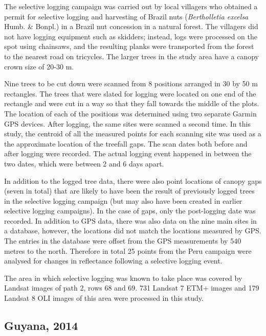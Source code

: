\documentclass[a4paper,12pt]{scrbook}
\begin{document}
The selective logging campaign was carried out by local villagers who obtained a permit for selective logging and harvesting of Brazil nuts (\textit{Bertholletia excelsa} Humb. \& Bonpl.) in a Brazil nut concession in a natural forest. The villagers did not have logging equipment such as skidders; instead, logs were processed on the spot using chainsaws, and the resulting planks were transported from the forest to the nearest road on tricycles. The larger trees in the study area have a canopy crown size of 20-30 m.

Nine trees to be cut down were scanned from 8 positions arranged in 30 by 50 m rectangles. The trees that were slated for logging were located on one end of the rectangle and were cut in a way so that they fall towards the middle of the plots. The location of each of the positions was determined using two separate Garmin \ac{GPS} devices. After logging, the same sites were scanned a second time. In this study, the centroid of all the measured points for each scanning site was used as a the approximate location of the treefall gaps. The scan dates both before and after logging were recorded. The actual logging event happened in between the two dates, which were between 2 and 6 days apart.

In addition to the logged tree data, there were also point locations of canopy gaps (seven in total) that are likely to have been the result of previously logged trees in the selective logging campaign (but may also have been created in earlier selective logging campaigns). In the case of gaps, only the post-logging date was recorded. In addition to \ac{GPS} data, there was also data on the nine main sites in a database, however, the locations did not match the locations measured by GPS. The entries in the database were offset from the GPS measurements by 540 metres to the north. Therefore in total 25 points from the Peru campaign were analysed for changes in reflectance following a selective logging event.

The area in which selective logging was known to take place was covered by Landsat images of path 2, rows 68 and 69. 731 Landsat 7 \ac{ETM+} images and 179 Landsat 8 \ac{OLI} images of this area were processed in this study.

\subsection{Guyana, 2014}
\end{document}
